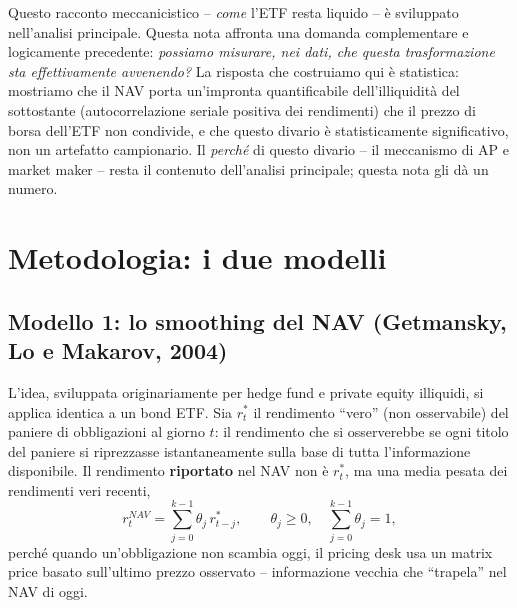 \documentclass[11pt]{article}
\begin{document}
Questo racconto meccanicistico -- \emph{come} l'ETF resta liquido -- \`e sviluppato nell'analisi principale. Questa nota affronta una domanda complementare e logicamente precedente: \emph{possiamo misurare, nei dati, che questa trasformazione sta effettivamente avvenendo?} La risposta che costruiamo qui \`e statistica: mostriamo che il NAV porta un'impronta quantificabile dell'illiquidit\`a del sottostante (autocorrelazione seriale positiva dei rendimenti) che il prezzo di borsa dell'ETF non condivide, e che questo divario \`e statisticamente significativo, non un artefatto campionario. Il \emph{perch\'e} di questo divario -- il meccanismo di AP e market maker -- resta il contenuto dell'analisi principale; questa nota gli d\`a un numero.

\section{Metodologia: i due modelli}
\label{sec:models}

\subsection{Modello 1: lo smoothing del NAV (Getmansky, Lo e Makarov, 2004)}
\label{sec:model1}

L'idea, sviluppata originariamente per hedge fund e private equity illiquidi, si applica identica a un bond ETF. Sia $r^\ast_t$ il rendimento ``vero'' (non osservabile) del paniere di obbligazioni al giorno $t$: il rendimento che si osserverebbe se ogni titolo del paniere si riprezzasse istantaneamente sulla base di tutta l'informazione disponibile. Il rendimento \textbf{riportato} nel NAV non \`e $r^\ast_t$, ma una media pesata dei rendimenti veri recenti,
\[
r^{NAV}_t = \sum_{j=0}^{k-1} \theta_j\, r^\ast_{t-j}, \qquad \theta_j \ge 0,\quad \sum_{j=0}^{k-1}\theta_j = 1,
\]
perch\'e quando un'obbligazione non scambia oggi, il pricing desk usa un matrix price basato sull'ultimo prezzo osservato -- informazione vecchia che ``trapela'' nel NAV di oggi.
\end{document}
